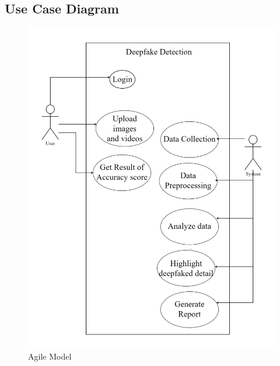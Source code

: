 
\subsection{Use Case Diagram}
\begin{figure}[h]
    \centering
    \includegraphics[width= 5in ]{img/usecasediagram.drawio.png}
    \caption{Agile Model}
\end{figure}
